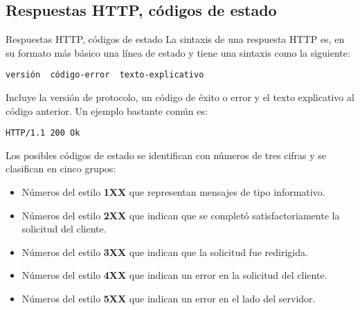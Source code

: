 

\subsection{Respuestas HTTP, códigos de estado} %

\begin{frame}[fragile]{Respuestas HTTP,  códigos de estado} %
    La sintaxis de una respuesta HTTP es, en su formato más básico una línea de estado y tiene una sintaxis como la siguiente:

    \begin{verbatim}
versión  código-error  texto-explicativo        
    \end{verbatim}
    Incluye la versión de protocolo, un código de éxito o error y el texto explicativo al código anterior. Un ejemplo bastante común es:
    \begin{verbatim}
HTTP/1.1 200 Ok
    \end{verbatim}
    Los posibles códigos de estado se identifican con números de tres cifras y se clasifican en cinco grupos:
    \begin{itemize}
		\item Números del estilo \textbf{1XX} que representan mensajes de tipo informativo.
		\item Números del estilo \textbf{2XX} que indican que se completó satisfactoriamente la solicitud del cliente.
		\item Números del estilo \textbf{3XX} que indican que la solicitud fue redirigida.
		\item Números del estilo \textbf{4XX} que indican un error en la solicitud del cliente.
		\item Números del estilo \textbf{5XX} que indican un error en el lado del servidor.
    \end{itemize}
\end{frame}

